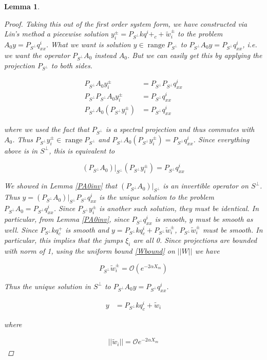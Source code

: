 \documentclass[12pt]{article}
\DeclareMathOperator{\ran}{range}
\newtheorem{lemma}{Lemma}
\begin{document}
\begin{lemma}
\begin{proof}
Taking this out of the first order system form, we have constructed via Lin's method a piecewise solution $y_i^\pm = P_{S^\perp} k q^i+_c + \tilde{w}_i^\pm$ to the problem $A_0 y = P_{S^\perp} q^i_{xx}$. What we want is solution $y \in \ran P_{S^\perp}$ to $P_{S^\perp} A_0 y = P_{S^\perp} q^i_{xx}$, i.e. we want the operator $P_{S^\perp} A_0$ instead $A_0$. But we can easily get this by applying the projection $P_{S^\perp}$ to both sides.

\begin{align*}
P_{S^\perp} A_0 y_i^\pm &= P_{S^\perp} P_{S^\perp} q^i_{xx} \\
P_{S^\perp} P_{S^\perp} A_0 y_i^\pm &= P_{S^\perp} q^i_{xx} \\
P_{S^\perp} A_0 (P_{S^\perp} y_i^\pm) &= P_{S^\perp} q^i_{xx}
\end{align*}

where we used the fact that $P_{S^\perp}$ is a spectral projection and thus commutes with $A_0$. Thus $P_{S^\perp} y_i^\pm \in \ran P_{S^\perp}$ and $P_{S^\perp} A_0 (P_{S^\perp} y_i^\pm) = P_{S^\perp} q^i_{xx}$. Since everything above is in $S^\perp$, this is equivalent to

\begin{equation}
(P_{S^\perp} A_0)|_{S^\perp} (P_{S^\perp} y_i^\pm) = P_{S^\perp} q^i_{xx}
\end{equation}

We showed in Lemma \ref{PA0inv} that $(P_{S^\perp} A_0)|_{S^\perp}$ is an invertible operator on $S^\perp$. Thus $y = (P_{S^\perp} A_0)|_{S^\perp} P_{S^\perp} q^i_{xx}$ is the unique solution to the problem $P_{S^\perp} A_0 = P_{S^\perp} q^i_{xx}$. Since $P_{S^\perp} y_i^\pm$ is another such solution, they must be identical. In particular, from Lemma \ref{PA0inv}, since $P_{S^\perp} q^i_{xx}$ is smooth, $y$ must be smooth as well. Since $P_{S^\perp} k q^+_c$ is smooth and $y = P_{S^\perp} k q^i_c + P_{S^\perp} \tilde{w}_i^\pm$, $P_{S^\perp} \tilde{w}_i^\pm$ must be smooth. In particular, this implies that the jumps $\xi_i$ are all 0. Since projections are bounded with norm of 1, using the uniform bound \eqref{Wbound} on $||W||$ we have 

\[
P_{S^\perp} \tilde{w}_i^\pm = \mathcal{O}(e^{-2 \alpha X_m})
\]

Thus the unique solution in $S^\perp$ to $P_{S^\perp} A_0 y = P_{S^\perp} q^i_{xx}$.

\begin{align*}
y &= P_{S^\perp} k q^i_c + \tilde{w}_i
\end{align*}

where

\begin{align*}
||\tilde{w}_i|| = \mathcal{O}e^{-2 \alpha X_m}
\end{align*}

\end{proof}
\end{lemma}
\end{document}
